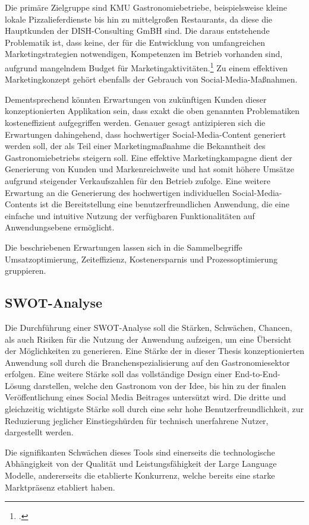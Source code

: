 Die primäre Zielgruppe sind \ac{KMU} Gastronomiebetriebe, beispielsweise kleine lokale Pizzalieferdienste bis hin zu mittelgroßen Restaurants, da diese die Hauptkunden der DISH-Consulting GmBH sind.
Die daraus entstehende Problematik ist, dass keine, der für die Entwicklung von umfangreichen Marketingstrategien notwendigen, Kompetenzen im Betrieb vorhanden sind, aufgrund mangelndem Budget für Marketingaktivitäten.\footcite{restroworks2024}
Zu einem effektiven Marketingkonzept gehört ebenfalls der Gebrauch von Social-Media-Maßnahmen.

Dementsprechend könnten Erwartungen von zukünftigen Kunden dieser konzeptionierten Applikation sein, dass exakt die oben genannten Problematiken kosteneffizient aufgegriffen werden.
Genauer gesagt antizipieren sich die Erwartungen dahingehend, dass hochwertiger Social-Media-Content generiert werden soll, der als Teil einer Marketingmaßnahme die Bekanntheit des Gastronomiebetriebs steigern soll.
Eine effektive Marketingkampagne dient der Generierung von Kunden und Markenreichweite und hat somit höhere Umsätze aufgrund steigender Verkaufszahlen für den Betrieb zufolge.
Eine weitere Erwartung an die Generierung des hochwertigen individuellen Social-Media-Contents ist die Bereitstellung eine benutzerfreundlichen Anwendung, die eine einfache und intuitive Nutzung der verfügbaren Funktionalitäten auf Anwendungsebene ermöglicht.

Die beschriebenen Erwartungen lassen sich in die Sammelbegriffe Umsatzoptimierung, Zeiteffizienz, Kostenersparnis und Prozessoptimierung gruppieren.

\subsection{SWOT-Analyse}
Die Durchführung einer SWOT-Analyse soll die Stärken, Schwächen, Chancen, als auch Risiken für die Nutzung der Anwendung aufzeigen, um eine Übersicht der Möglichkeiten zu generieren.
Eine Stärke der in dieser Thesis konzeptionierten Anwendung soll durch die Branchenspezialisierung auf den Gastronomiesektor erfolgen.
Eine weitere Stärke soll das vollständige Design einer End-to-End-Lösung darstellen, welche den Gastronom von der Idee, bis hin zu der finalen Veröffentlichung eines Social Media Beitrages untersützt wird.
Die dritte und gleichzeitig wichtigste Stärke soll durch eine sehr hohe Benutzerfreundlichkeit, zur Reduzierung jeglicher Einstiegshürden für technisch unerfahrene Nutzer, dargestellt werden.

Die signifikanten Schwächen dieses Tools sind einerseits die technologische Abhängigkeit von der Qualität und Leistungsfähigkeit der Large Language Modelle, andererseits die etablierte Konkurrenz, welche bereits eine starke Marktpräsenz etabliert haben.

